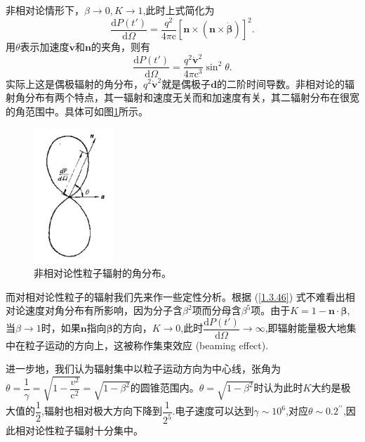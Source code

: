 \documentclass[../天体物理基础.tex]{subfiles}
\begin{document}
非相对论情形下，$\beta\to0,K\to1$,此时上式简化为
\begin{equation}
\frac{\mathrm{d}P\left(t'\right)}{\mathrm{d}\Omega}=\frac{q^{2}}{4\pi\mathrm{c}}\left[\boldsymbol{n}\times\left(\boldsymbol{n}\times\dot{\boldsymbol{\beta}}\right)\right]^{2}.
\end{equation}
用$\theta$表示加速度$\dot{\boldsymbol{v}}$和$\boldsymbol{n}$的夹角，则有
\begin{equation}
\frac{\mathrm{d}P\left(t'\right)}{\mathrm{d}\Omega}=\frac{q^{2}\dot{\boldsymbol{v}}^{2}}{4\pi\mathrm{c}^{3}}\sin^{2}\theta.
\end{equation}
实际上这是偶极辐射的角分布，$q^{2}\dot{\boldsymbol{v}}^{2}$就是偶极子$\boldsymbol{d}$的二阶时间导数。非相对论的辐射角分布有两个特点，其一辐射和速度无关而和加速度有关，其二辐射分布在很宽的角范围中。具体可如图\ref{非相对论性粒子辐射的角分布。}所示。
\begin{figure}[!htbp]
\centering
\includegraphics[width=3cm]{figures/figure1_5.png}
\captionsetup{justification=raggedright, singlelinecheck=false}
\caption{非相对论性粒子辐射的角分布。}
\label{非相对论性粒子辐射的角分布。}
\end{figure}

而对相对论性粒子的辐射我们先来作一些定性分析。根据 (\ref{1.3.46}) 式不难看出相对论速度对角分布有所影响，因为分子含$\beta^{2}$项而分母含$\beta^{5}$项。由于$K=1-\boldsymbol{n}\cdot\boldsymbol{\beta}$,当$\beta\to1$时，如果$\boldsymbol{n}$指向$\boldsymbol{\beta}$的方向，$K\to0$,此时$\dfrac{\mathrm{d}P\left(t'\right)}{\mathrm{d}\Omega}\to\infty$,即辐射能量极大地集中在粒子运动的方向上，这被称作集束效应 (beaming effect).

进一步地，我们认为辐射集中以粒子运动方向为中心线，张角为$\theta=\dfrac{1}{\gamma}=\sqrt{1-\dfrac{v^{2}}{\mathrm{c}^{2}}}=\sqrt{1-\beta^{2}}$的圆锥范围内。$\theta=\sqrt{1-\beta^{2}}$时认为此时$K$大约是极大值的$\dfrac{1}{2}$,辐射也相对极大方向下降到$\dfrac{1}{2^{5}}$.电子速度可以达到$\gamma\sim10^{6}$,对应$\theta\sim0.2^{\prime\prime}$,因此相对论性粒子辐射十分集中。
\end{document}

